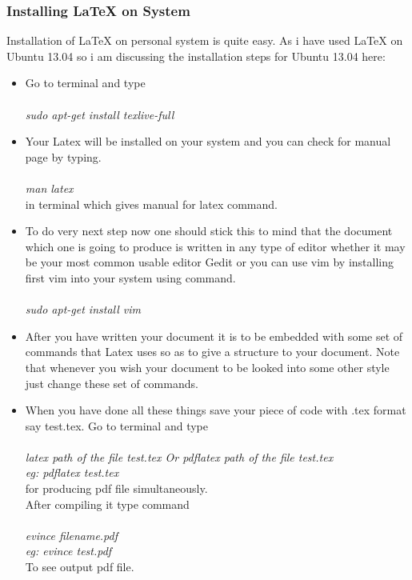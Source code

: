 \subsubsection{Installing \LaTeX{} on System}
Installation of \LaTeX{} on personal system is quite easy. As i have used \LaTeX{} on Ubuntu 13.04 so i am discussing the installation steps for Ubuntu 13.04 here:
\begin{itemize}
\item Go to terminal and type\\\\
\textit{sudo apt-get install texlive-full}
\item Your Latex will be installed on your system and you can check for manual page by typing.\\\\
\textit{man latex}\\

in terminal which gives manual for latex command.
\item To do very next step now one should stick this to mind that the document which one is going to produce is written in any type of editor whether it may be your most common usable editor Gedit or you can use vim by installing first vim into your system using command.\\\\
\textit{sudo apt-get install vim}
\item After you have written your document it is to be embedded with some set of commands that Latex uses so as to give a structure to your document. Note that whenever you wish your document to be looked into some other style just change these set of commands.
\item When you have done all these things save your piece of code with .tex format say test.tex. Go to terminal and type\\\\
\textit{latex path of the file test.tex Or pdflatex path of the file test.tex\\ eg: pdflatex test.tex}\\
for producing pdf file simultaneously.\\
After compiling it type command\\\\
\textit{evince filename.pdf\\ eg: evince test.pdf}\\
To see output pdf file. 
\end{itemize}

